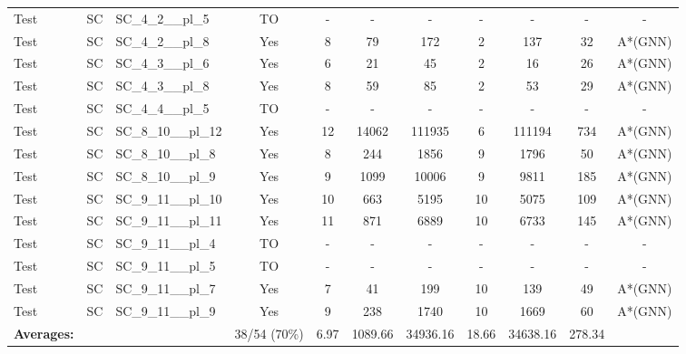 \documentclass{article}
\begin{document}
\begin{tabular}{lllcccccccc}
Test & SC & SC\_4\_2\_\_pl\_5 & TO & - & - & - & - & - & - & - \\
Test & SC & SC\_4\_2\_\_pl\_8 & Yes & 8 & 79 & 172 & 2 & 137 & 32 & A*(GNN) \\
Test & SC & SC\_4\_3\_\_pl\_6 & Yes & 6 & 21 & 45 & 2 & 16 & 26 & A*(GNN) \\
Test & SC & SC\_4\_3\_\_pl\_8 & Yes & 8 & 59 & 85 & 2 & 53 & 29 & A*(GNN) \\
Test & SC & SC\_4\_4\_\_pl\_5 & TO & - & - & - & - & - & - & - \\
Test & SC & SC\_8\_10\_\_pl\_12 & Yes & 12 & 14062 & 111935 & 6 & 111194 & 734 & A*(GNN) \\
Test & SC & SC\_8\_10\_\_pl\_8 & Yes & 8 & 244 & 1856 & 9 & 1796 & 50 & A*(GNN) \\
Test & SC & SC\_8\_10\_\_pl\_9 & Yes & 9 & 1099 & 10006 & 9 & 9811 & 185 & A*(GNN) \\
Test & SC & SC\_9\_11\_\_pl\_10 & Yes & 10 & 663 & 5195 & 10 & 5075 & 109 & A*(GNN) \\
Test & SC & SC\_9\_11\_\_pl\_11 & Yes & 11 & 871 & 6889 & 10 & 6733 & 145 & A*(GNN) \\
Test & SC & SC\_9\_11\_\_pl\_4 & TO & - & - & - & - & - & - & - \\
Test & SC & SC\_9\_11\_\_pl\_5 & TO & - & - & - & - & - & - & - \\
Test & SC & SC\_9\_11\_\_pl\_7 & Yes & 7 & 41 & 199 & 10 & 139 & 49 & A*(GNN) \\
Test & SC & SC\_9\_11\_\_pl\_9 & Yes & 9 & 238 & 1740 & 10 & 1669 & 60 & A*(GNN) \\
\textbf{Averages:} & & & 38/54 (70\%) & 6.97 & 1089.66 & 34936.16 & 18.66 & 34638.16 & 278.34 & \\
\bottomrule
\end{tabular}
\newpage
\end{document}
